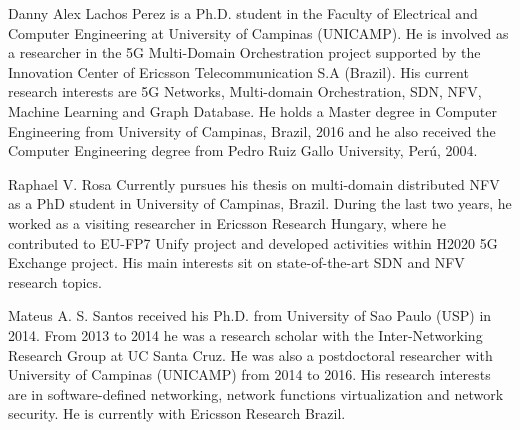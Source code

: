 \documentclass[journal]{IEEEtran}
\begin{document}
\begin{IEEEbiography}{Danny Alex Lachos Perez}
is a Ph.D. student in the Faculty of Electrical and Computer Engineering at University of Campinas (UNICAMP). He is involved as a researcher in the 5G Multi-Domain Orchestration project supported by the Innovation Center of Ericsson Telecommunication S.A (Brazil). His current research interests are 5G Networks, Multi-domain Orchestration, SDN, NFV, Machine Learning and Graph Database. He holds a Master degree in Computer Engineering from University of Campinas, Brazil, 2016 and he also received the Computer Engineering degree from Pedro Ruiz Gallo University, Per\'{u}, 2004.
\end{IEEEbiography}

\begin{IEEEbiography}{Raphael V. Rosa}
Currently pursues his thesis on multi-domain distributed NFV as a PhD student in University of Campinas, Brazil. During the last two years, he worked as a visiting researcher in Ericsson Research Hungary, where he contributed to EU-FP7 Unify project and developed activities within H2020 5G Exchange project. His main interests sit on state-of-the-art SDN and NFV research topics. \\
\end{IEEEbiography}

\begin{IEEEbiography}{Mateus A. S. Santos} received his Ph.D. from University of Sao Paulo (USP) in 2014. From 2013 to 2014 he was a research scholar with the Inter-Networking Research Group at UC Santa Cruz. He was also a postdoctoral researcher with University of Campinas (UNICAMP) from 2014 to 2016. His research interests are in software-defined networking, network functions virtualization and network security. He is currently with Ericsson Research Brazil.
\end{IEEEbiography}
\end{document}
